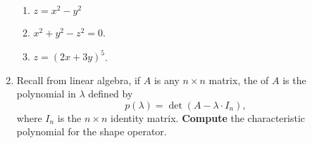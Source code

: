\begin{enumerate}
\begin{enumerate}
  \item $z = x^{2}-y^{2}$
  \item $x^{2}+y^{2}-z^{2}=0$.
  \item $z = (2x + 3y)^{5}$.
  \end{enumerate}
\item Recall from linear algebra, if $A$ is any $n\times n$ matrix, the
   of $A$ is the polynomial in
  $\lambda$ defined by
  \begin{equation*}
p(\lambda) = \det(A - \lambda\cdot I_{n}),
  \end{equation*}
  where $I_{n}$ is the $n\times n$ identity matrix. \textbf{Compute} the
  characteristic polynomial for the shape operator.
\end{enumerate}